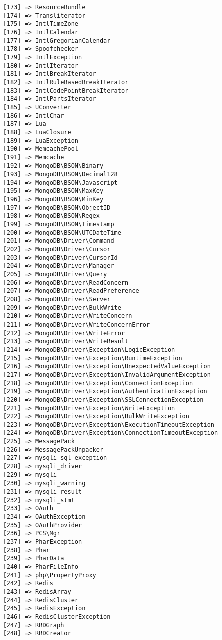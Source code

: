 \begin{lstlisting}
    [173] => ResourceBundle
    [174] => Transliterator
    [175] => IntlTimeZone
    [176] => IntlCalendar
    [177] => IntlGregorianCalendar
    [178] => Spoofchecker
    [179] => IntlException
    [180] => IntlIterator
    [181] => IntlBreakIterator
    [182] => IntlRuleBasedBreakIterator
    [183] => IntlCodePointBreakIterator
    [184] => IntlPartsIterator
    [185] => UConverter
    [186] => IntlChar
    [187] => Lua
    [188] => LuaClosure
    [189] => LuaException
    [190] => MemcachePool
    [191] => Memcache
    [192] => MongoDB\BSON\Binary
    [193] => MongoDB\BSON\Decimal128
    [194] => MongoDB\BSON\Javascript
    [195] => MongoDB\BSON\MaxKey
    [196] => MongoDB\BSON\MinKey
    [197] => MongoDB\BSON\ObjectID
    [198] => MongoDB\BSON\Regex
    [199] => MongoDB\BSON\Timestamp
    [200] => MongoDB\BSON\UTCDateTime
    [201] => MongoDB\Driver\Command
    [202] => MongoDB\Driver\Cursor
    [203] => MongoDB\Driver\CursorId
    [204] => MongoDB\Driver\Manager
    [205] => MongoDB\Driver\Query
    [206] => MongoDB\Driver\ReadConcern
    [207] => MongoDB\Driver\ReadPreference
    [208] => MongoDB\Driver\Server
    [209] => MongoDB\Driver\BulkWrite
    [210] => MongoDB\Driver\WriteConcern
    [211] => MongoDB\Driver\WriteConcernError
    [212] => MongoDB\Driver\WriteError
    [213] => MongoDB\Driver\WriteResult
    [214] => MongoDB\Driver\Exception\LogicException
    [215] => MongoDB\Driver\Exception\RuntimeException
    [216] => MongoDB\Driver\Exception\UnexpectedValueException
    [217] => MongoDB\Driver\Exception\InvalidArgumentException
    [218] => MongoDB\Driver\Exception\ConnectionException
    [219] => MongoDB\Driver\Exception\AuthenticationException
    [220] => MongoDB\Driver\Exception\SSLConnectionException
    [221] => MongoDB\Driver\Exception\WriteException
    [222] => MongoDB\Driver\Exception\BulkWriteException
    [223] => MongoDB\Driver\Exception\ExecutionTimeoutException
    [224] => MongoDB\Driver\Exception\ConnectionTimeoutException
    [225] => MessagePack
    [226] => MessagePackUnpacker
    [227] => mysqli_sql_exception
    [228] => mysqli_driver
    [229] => mysqli
    [230] => mysqli_warning
    [231] => mysqli_result
    [232] => mysqli_stmt
    [233] => OAuth
    [234] => OAuthException
    [235] => OAuthProvider
    [236] => PCS\Mgr
    [237] => PharException
    [238] => Phar
    [239] => PharData
    [240] => PharFileInfo
    [241] => php\PropertyProxy
    [242] => Redis
    [243] => RedisArray
    [244] => RedisCluster
    [245] => RedisException
    [246] => RedisClusterException
    [247] => RRDGraph
    [248] => RRDCreator

\end{lstlisting}

